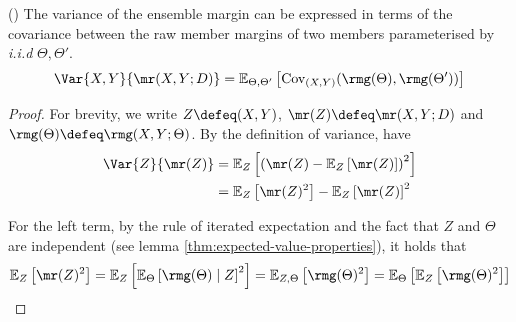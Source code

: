 \documentclass[
    a4paper, %
	fontsize=10pt, %
	twoside=false, %
]{kaobook}
\begin{document}
\begin{theorem} (\cite{breiman_RandomForests_2001})
The variance of the ensemble margin can be expressed in terms of the covariance between the raw member margins of two members parameterised by \textit{i.i.d} $\Theta, \Theta'$.
	$$
	\Var{X,Y}{\mr(X,Y;D)} = \mathbb{E}_{\Theta, \Theta'}\left[ \text{Cov}_{(X,Y)}(\rmg(\Theta), \rmg(\Theta') ) \right] 
	$$
\end{theorem}
\begin{proof}
	For brevity, we write
	  $Z \defeq (X,Y)$,
	 $\mr(Z) \defeq \mr(X,Y;D)$ and
	 $\rmg(\Theta) \defeq \rmg(X,Y;\Theta)$.
By the definition of variance, have
\begin{align*}
\Var{Z}{\mr(Z)} &= \mathbb{E}_{Z}\left[ \left(\mr(Z) - \mathbb{E}_{Z}\left[ \mr(Z) \right]\right) ^2 \right]  \\
&= \mathbb{E}_{Z}\left[ \mr(Z)^2 \right] - \mathbb{E}_{Z}\left[ \mr(Z) \right] ^2 \\
\end{align*}

For the left term, by the rule of iterated expectation and the fact that $Z$ and $\Theta$ are independent (see lemma \ref{thm:expected-value-properties}), it holds that
$$
\mathbb{E}_{Z}\left[ \mr(Z) ^2 \right]  = \mathbb{E}_{Z}\left[ \mathbb{E}_{\Theta}\left[ \rmg(\Theta) \mid Z \right] ^2  \right] = \mathbb{E}_{Z, \Theta}\left[ \rmg(\Theta)^2 \right] %
= \mathbb{E}_{\Theta}\left[ \mathbb{E}_{Z}\left[ \rmg(\Theta) ^2 \right]  \right] 
$$


\end{proof}
\end{document}
